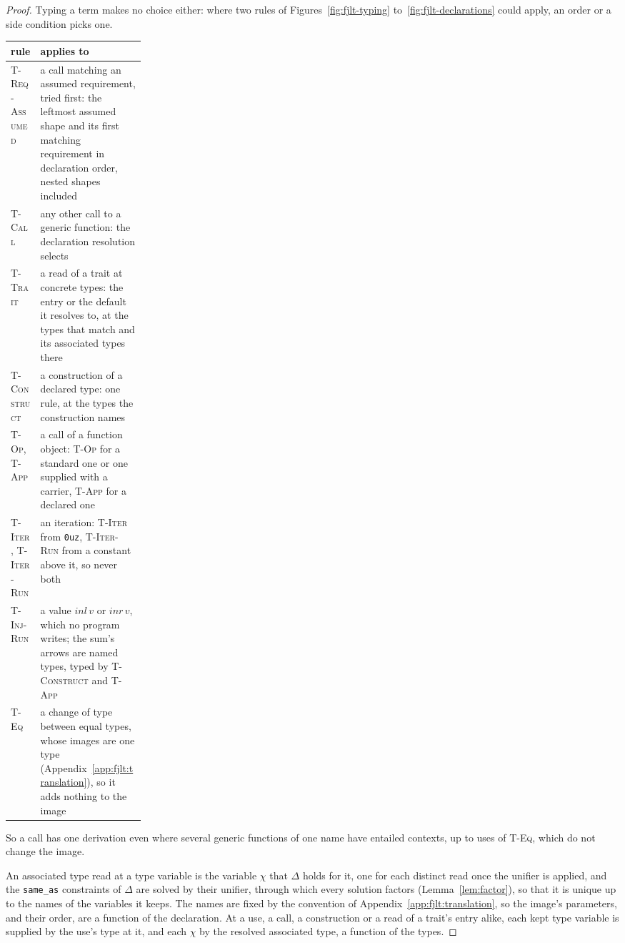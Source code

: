 \begin{proof}
Typing a term makes no choice either: where two rules of Figures~\ref{fig:fjlt-typing} to~\ref{fig:fjlt-declarations} could apply, an order or a side condition picks one.
\begin{center}
\small
\begin{tabularx}{\linewidth}{@{}>{\raggedright\arraybackslash}p{0.22\linewidth}>{\raggedright\arraybackslash}X@{}}
\toprule
rule & applies to \\
\midrule
\textsc{T-Req-Assumed} & a call matching an assumed requirement, tried first: the leftmost assumed shape and its first matching requirement in declaration order, nested shapes included \\
\textsc{T-Call} & any other call to a generic function: the declaration resolution selects \\
\textsc{T-Trait} & a read of a trait at concrete types: the entry or the default it resolves to, at the types that match and its associated types there \\
\textsc{T-Construct} & a construction of a declared type: one rule, at the types the construction names \\
\textsc{T-Op}, \textsc{T-App} & a call of a function object: \textsc{T-Op} for a standard one or one supplied with a carrier, \textsc{T-App} for a declared one \\
\textsc{T-Iter}, \textsc{T-Iter-Run} & an iteration: \textsc{T-Iter} from \texttt{0uz}, \textsc{T-Iter-Run} from a constant above it, so never both \\
\textsc{T-Inj-Run} & a value $\mathit{inl}\,v$ or $\mathit{inr}\,v$, which no program writes; the sum's arrows are named types, typed by \textsc{T-Construct} and \textsc{T-App} \\
\textsc{T-Eq} & a change of type between equal types, whose images are one type (Appendix~\ref{app:fjlt:translation}), so it adds nothing to the image \\
\bottomrule
\end{tabularx}
\end{center}
So a call has one derivation even where several generic functions of one name have entailed contexts, up to uses of \textsc{T-Eq}, which do not change the image.

An associated type read at a type variable is the variable $\chi$ that $\Delta$ holds for it, one for each distinct read once the unifier is applied, and the \texttt{same\_as} constraints of $\Delta$ are solved by their unifier, through which every solution factors (Lemma~\ref{lem:factor}), so that it is unique up to the names of the variables it keeps.
The names are fixed by the convention of Appendix~\ref{app:fjlt:translation}, so the image's parameters, and their order, are a function of the declaration.
At a use, a call, a construction or a read of a trait's entry alike, each kept type variable is supplied by the use's type at it, and each $\chi$ by the resolved associated type, a function of the types.


\end{proof}
